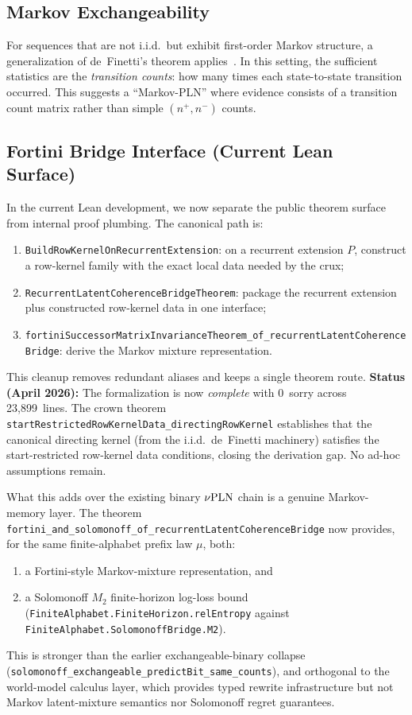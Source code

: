 \documentclass[]{article}
\begin{document}
\subsection{Markov Exchangeability}
For sequences that are not i.i.d.\ but exhibit first-order Markov
structure, a generalization of de~Finetti's theorem
applies~\cite{diaconisfreedman}.  In this setting, the sufficient
statistics are the \emph{transition counts}: how many times each
state-to-state transition occurred.  This suggests a ``Markov-PLN''
where evidence consists of a transition count matrix rather than
simple $(n^+, n^-)$ counts.

\subsection{Fortini Bridge Interface (Current Lean Surface)}
In the current Lean development, we now separate the public theorem
surface from internal proof plumbing.  The canonical path is:
\begin{enumerate}
\item \texttt{BuildRowKernelOnRecurrentExtension}: on a recurrent extension
$P$, construct a row-kernel family with the exact local data needed by
the crux;
\item \texttt{RecurrentLatentCoherenceBridgeTheorem}: package the
recurrent extension plus constructed row-kernel data in one interface;
\item \texttt{fortiniSuccessorMatrixInvarianceTheorem\_of\_recurrentLatentCoherenceBridge}:
derive the Markov mixture representation.
\end{enumerate}

This cleanup removes redundant aliases and keeps a single theorem route.
\textbf{Status (April 2026):} The formalization is now \emph{complete}
with 0~sorry across 23,899~lines.  The crown theorem
\texttt{startRestrictedRowKernelData\_directingRowKernel} establishes
that the canonical directing kernel (from the i.i.d.\ de~Finetti
machinery) satisfies the start-restricted row-kernel data conditions,
closing the derivation gap.  No ad-hoc assumptions remain.

What this adds over the existing binary $\nu\textup{PLN}$ chain is a genuine
Markov-memory layer.  The theorem
\texttt{fortini\_and\_solomonoff\_of\_recurrentLatentCoherenceBridge}
now provides, for the same finite-alphabet prefix law $\mu$, both:
\begin{enumerate}
\item a Fortini-style Markov-mixture representation, and
\item a Solomonoff $M_2$ finite-horizon log-loss bound
(\texttt{FiniteAlphabet.FiniteHorizon.relEntropy} against
\texttt{FiniteAlphabet.SolomonoffBridge.M2}).
\end{enumerate}
This is stronger than the earlier exchangeable-binary collapse
(\texttt{solomonoff\_exchangeable\_predictBit\_same\_counts}), and
orthogonal to the world-model calculus layer, which provides typed
rewrite infrastructure but not Markov latent-mixture semantics nor
Solomonoff regret guarantees.
\end{document}
